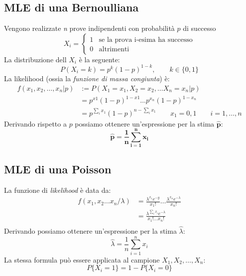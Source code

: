 \documentclass[]{article}
\begin{document}
    \subsection{MLE di una Bernoulliana}
    Vengono realizzate \textit{n} prove indipendenti con probabilità $p$ di successo
    \begin{equation*}
        X_i =
        \begin{cases}
            1 & \text{se la prova i-esima ha successo} \\
            0 & \text{altrimenti}
        \end{cases}
    \end{equation*}
    La distribuzione dell $X_i$ è la seguente:
    \[ P(X_i = k) = p^k (1-p)^{1-k}, \qquad k \in \{0,1\} \]
    La likelihood (ossia la \textit{funzione di massa congiunta}) è:
    \begin{equation*}
        \begin{split}
            f(x_1, x_2, \ldots, x_n \rvert p) &:= P(X_1 = x_1, X_2 = x_2, \ldots X_n = x_n \rvert p) \\
            &= p^{x1}(1-p)^{1-x1} \ldots p^{x_n}(1-p)^{1-x_n} \\
            &= p^{\sum_{i}^{} x_1}(1-p)^{n- \sum_{i}^{} x_1} \qquad x_1 = 0,1 \qquad i = 1, \ldots, n
        \end{split}
    \end{equation*}
    Derivando rispetto a $p$ possiamo ottenere un'espressione per la stima $\boldsymbol{\hat{p}}$:
    \[ \boldsymbol{\hat{p} = \frac{1}{n} \sum_{i = 1}^{n} x_i} \]
    \subsection{MLE di una Poisson}
    La funzione di \textit{likelihood} è data da:
    \begin{equation*}
        \begin{split}
            f(x_1, x_2 \ldots x_n / \lambda) &= \frac{\lambda^{x_1} e^{-y}}{x_1!} \ldots \frac{\lambda^{x_n} e^{-\lambda}}{x_n!} \\
            &= \frac{\lambda^{\sum_{i}^{} x_i} e^{-\lambda}}{x_1 ! \ldots x_n !} \\
        \end{split}
    \end{equation*}
    Derivando possiamo ottenere un'espressione per la stima $\hat{\lambda}$:
    \[ \hat{\lambda} = \frac{1}{n} \sum_{i = 1}^{n} x_i \]
    La stessa formula può essere applicata al campione $X_1, X_2, \ldots, X_n$:
    \[ P\{X_i = 1\} = 1 - P\{X_i = 0\} \]
\end{document}
